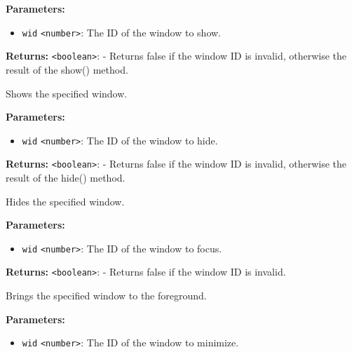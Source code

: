 \documentclass[12pt,a4paper]{article}
\begin{document}
\noindent \textbf{Parameters:}
\begin{itemize}
  \item \texttt{wid} \texttt{<number>}: The ID of the window to show.
\end{itemize}

\noindent \textbf{Returns:} \texttt{<boolean>}: - Returns false if the window ID is invalid, otherwise the result of the show() method.

\noindent Shows the specified window.

\vspace{5mm}
\noindent {}


\noindent \textbf{Parameters:}
\begin{itemize}
  \item \texttt{wid} \texttt{<number>}: The ID of the window to hide.
\end{itemize}

\noindent \textbf{Returns:} \texttt{<boolean>}: - Returns false if the window ID is invalid, otherwise the result of the hide() method.

\noindent Hides the specified window.

\vspace{5mm}
\noindent {}


\noindent \textbf{Parameters:}
\begin{itemize}
  \item \texttt{wid} \texttt{<number>}: The ID of the window to focus.
\end{itemize}

\noindent \textbf{Returns:} \texttt{<boolean>}: - Returns false if the window ID is invalid.

\noindent Brings the specified window to the foreground.

\vspace{5mm}
\noindent {}


\noindent \textbf{Parameters:}
\begin{itemize}
  \item \texttt{wid} \texttt{<number>}: The ID of the window to minimize.
\end{itemize}
\end{document}
